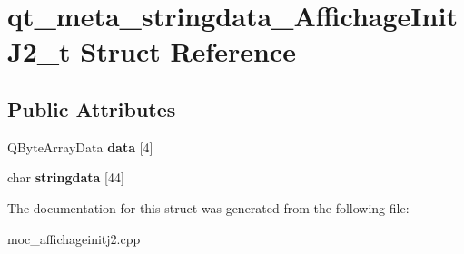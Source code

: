 \hypertarget{structqt__meta__stringdata__AffichageInitJ2__t}{\section{qt\+\_\+meta\+\_\+stringdata\+\_\+\+Affichage\+Init\+J2\+\_\+t Struct Reference}
\label{structqt__meta__stringdata__AffichageInitJ2__t}
}
\subsection*{Public Attributes}
\begin{DoxyCompactItemize}
\item 
\hypertarget{structqt__meta__stringdata__AffichageInitJ2__t_a1cdbc0adf6fb95ef483de4d8ddd83d72}{Q\+Byte\+Array\+Data {\bfseries data} \mbox{[}4\mbox{]}}\label{structqt__meta__stringdata__AffichageInitJ2__t_a1cdbc0adf6fb95ef483de4d8ddd83d72}

\item 
\hypertarget{structqt__meta__stringdata__AffichageInitJ2__t_ae3684bd8160bd567b5461ced5212a46a}{char {\bfseries stringdata} \mbox{[}44\mbox{]}}\label{structqt__meta__stringdata__AffichageInitJ2__t_ae3684bd8160bd567b5461ced5212a46a}

\end{DoxyCompactItemize}


The documentation for this struct was generated from the following file\+:\begin{DoxyCompactItemize}
\item 
moc\+\_\+affichageinitj2.\+cpp\end{DoxyCompactItemize}
